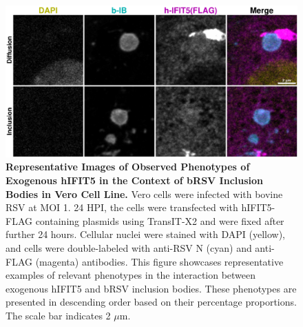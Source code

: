 \begin{figure}
    \centering
    \includegraphics[width=1\linewidth]{09. Chapter 4/Figs/02. Overexpression/04. IFIT5/06. i5-brsv.pdf}
    \caption[Representative Images of Observed Phenotypes of Exogenous hIFIT5 in the Context of bRSV Inclusion Bodies in Vero Cell Line.]{\textbf{Representative Images of Observed Phenotypes of Exogenous hIFIT5 in the Context of bRSV Inclusion Bodies in Vero Cell Line.} Vero cells were infected with bovine RSV at MOI 1. 24 HPI, the cells were transfected with hIFIT5-FLAG containing plasmids using TransIT-X2 and were fixed after further 24 hours. Cellular nuclei were stained with DAPI (yellow), and cells were double-labeled with anti-RSV N (cyan) and anti-FLAG (magenta) antibodies. This figure showcases representative examples of relevant phenotypes in the interaction between exogenous hIFIT5 and bRSV inclusion bodies. These phenotypes are presented in descending order based on their percentage proportions. The scale bar indicates 2 \(\mu \mbox{m}\).}
    \label{fig:Representative Images of Observed Phenotypes of Exogenous hIFIT5 in the Context of bRSV Inclusion Bodies in VERO Cell Line}
\end{figure}

